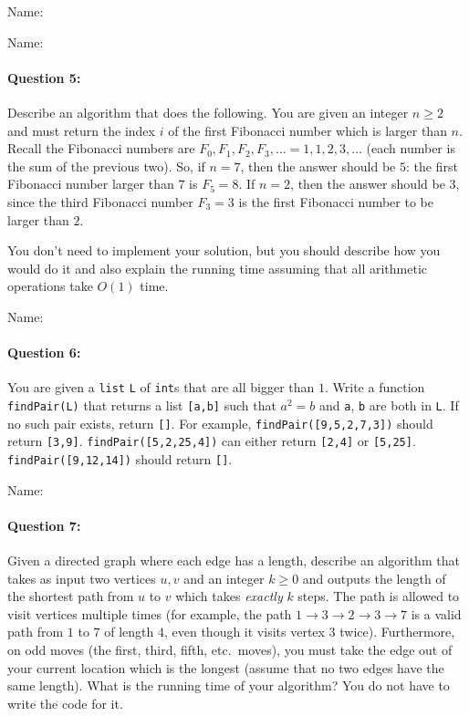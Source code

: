 \documentclass[11pt]{article}
\begin{document}
\newpage
\noindent Name:
\newpage

\noindent Name:

\paragraph{Question 5:}
Describe an algorithm that does the following.  You are given an
integer $n\ge 2$ and must return the index $i$ of the first Fibonacci
number which is larger than $n$.  Recall the Fibonacci numbers are
$F_0,F_1,F_2,F_3,\ldots = 1,1,2,3,\ldots$ (each number is
the sum
of the previous two).  So, if $n=7$, then the answer should be $5$:
the first Fibonacci number larger than $7$ is $F_5 = 8$.  If $n=2$,
then the answer should be $3$, since the third Fibonacci number $F_3 =
3$ is the first Fibonacci
number to be larger than $2$.

You don't need to implement your solution, but you should describe how
you would do it and also explain the running time assuming that all
arithmetic operations take $O(1)$ time.

\newpage

\noindent Name:

\paragraph{Question 6:}
You are given a \texttt{list} \texttt{L} of \texttt{int}s that are all
bigger than $1$.  Write a function \texttt{findPair(L)} that returns a
list \texttt{[a,b]} such that $a^2 = b$ and \texttt{a}, \texttt{b} are
both in \texttt{L}.  If no such pair exists, return \texttt{[]}.  For
example, \texttt{findPair([9,5,2,7,3])} should return \texttt{[3,9]}.
\texttt{findPair([5,2,25,4])} can either return \texttt{[2,4]} or
\texttt{[5,25]}.  \texttt{findPair([9,12,14])} should return
\texttt{[]}.  

\newpage

\noindent Name:

\paragraph{Question 7:}  
Given a directed graph where each edge has a
length, describe an algorithm that takes as input two vertices $u,v$
and an integer $k\ge 0$ and outputs the length of the shortest path
from $u$ to $v$ which takes {\em exactly} $k$ steps.  The path is
allowed to visit vertices multiple times (for example, the path
$1\rightarrow 3\rightarrow 2\rightarrow 3\rightarrow 7$ is a valid
path from $1$ to $7$ of length $4$, even though it visits vertex $3$
twice).  
Furthermore, on odd moves (the first, third, fifth, etc.\ moves), you
must take the edge out of your current location which is the longest
(assume that no two edges have the same length).
What is the running time of your algorithm?  You do not have
to write the code for it.
\end{document}

